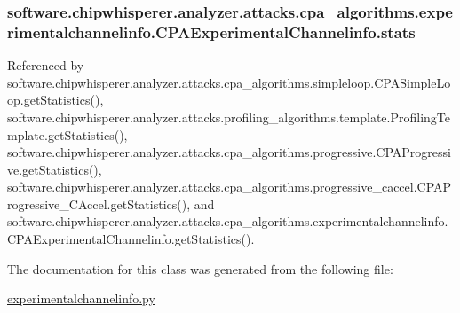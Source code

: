 \subsubsection[{stats}]{\setlength{\rightskip}{0pt plus 5cm}software.\+chipwhisperer.\+analyzer.\+attacks.\+cpa\+\_\+algorithms.\+experimentalchannelinfo.\+C\+P\+A\+Experimental\+Channelinfo.\+stats}\label{classsoftware_1_1chipwhisperer_1_1analyzer_1_1attacks_1_1cpa__algorithms_1_1experimentalchannelif6c161da2587ecb2ba5aefd93c43622a_a3da347b24ca3287224d4f3e023e100ac}


Referenced by software.\+chipwhisperer.\+analyzer.\+attacks.\+cpa\+\_\+algorithms.\+simpleloop.\+C\+P\+A\+Simple\+Loop.\+get\+Statistics(), software.\+chipwhisperer.\+analyzer.\+attacks.\+profiling\+\_\+algorithms.\+template.\+Profiling\+Template.\+get\+Statistics(), software.\+chipwhisperer.\+analyzer.\+attacks.\+cpa\+\_\+algorithms.\+progressive.\+C\+P\+A\+Progressive.\+get\+Statistics(), software.\+chipwhisperer.\+analyzer.\+attacks.\+cpa\+\_\+algorithms.\+progressive\+\_\+caccel.\+C\+P\+A\+Progressive\+\_\+\+C\+Accel.\+get\+Statistics(), and software.\+chipwhisperer.\+analyzer.\+attacks.\+cpa\+\_\+algorithms.\+experimentalchannelinfo.\+C\+P\+A\+Experimental\+Channelinfo.\+get\+Statistics().



The documentation for this class was generated from the following file\+:\begin{DoxyCompactItemize}
\item 
\hyperlink{experimentalchannelinfo_8py}{experimentalchannelinfo.\+py}\end{DoxyCompactItemize}
